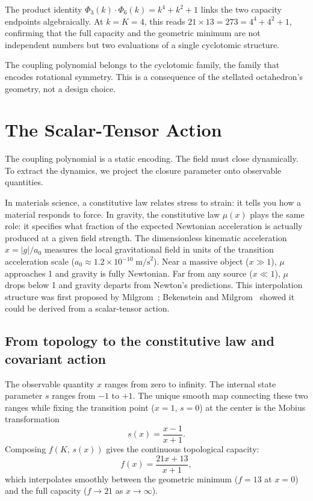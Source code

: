\documentclass[twocolumn]{iopjournal}
\begin{document}
The product identity $\Phi_3(k) \cdot \Phi_6(k) = k^4 + k^2 + 1$ links the two capacity endpoints algebraically. At $k = K = 4$, this reads $21 \times 13 = 273 = 4^4 + 4^2 + 1$, confirming that the full capacity and the geometric minimum are not independent numbers but two evaluations of a single cyclotomic structure.

The coupling polynomial belongs to the cyclotomic family, the family that encodes rotational symmetry. This is a consequence of the stellated octahedron's geometry, not a design choice.


\section{The Scalar-Tensor Action}
\label{sec:action}

The coupling polynomial is a static encoding. The field must close dynamically. To extract the dynamics, we project the closure parameter onto observable quantities.

In materials science, a constitutive law relates stress to strain: it tells you how a material responds to force. In gravity, the constitutive law $\mu(x)$ plays the same role: it specifies what fraction of the expected Newtonian acceleration is actually produced at a given field strength. The dimensionless kinematic acceleration $x = |g|/a_0$ measures the local gravitational field in units of the transition acceleration scale ($a_0 \approx 1.2 \times 10^{-10}\;\text{m/s}^2$). Near a massive object ($x \gg 1$), $\mu$ approaches 1 and gravity is fully Newtonian. Far from any source ($x \ll 1$), $\mu$ drops below 1 and gravity departs from Newton's predictions. This interpolation structure was first proposed by Milgrom~\cite{Milgrom1983}; Bekenstein and Milgrom~\cite{BekensteinMilgrom1984} showed it could be derived from a scalar-tensor action.

\subsection{From topology to the constitutive law and covariant action}

The observable quantity $x$ ranges from zero to infinity. The internal state parameter $s$ ranges from $-1$ to $+1$. The unique smooth map connecting these two ranges while fixing the transition point ($x = 1$, $s = 0$) at the center is the Mobius transformation
\begin{equation}
s(x) = \frac{x - 1}{x + 1}.
\end{equation}
Composing $f(K,\, s(x))$ gives the continuous topological capacity:
\begin{equation}
f(x) = \frac{21x + 13}{x + 1},
\end{equation}
which interpolates smoothly between the geometric minimum ($f = 13$ at $x = 0$) and the full capacity ($f \to 21$ as $x \to \infty$).
\end{document}
